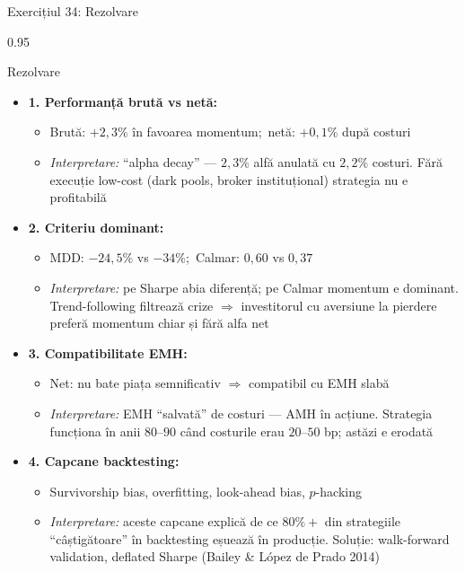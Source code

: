 \documentclass[9pt, aspectratio=169, t]{beamer}
\begin{document}
\begin{frame}[shrink=30]{Exercițiul 34: Rezolvare}
\begin{cminipage}{0.95\textwidth}
\begin{exampleblock}{Rezolvare}
\begin{itemize}\setlength{\itemsep}{0pt}
    \item \textbf{1. Performanță brută vs netă:}
    \begin{itemize}\setlength{\itemsep}{0pt}
        \item Brută: $+2{,}3\%$ în favoarea momentum;\ netă: $+0{,}1\%$ după costuri
        \item \textit{Interpretare:} ``alpha decay'' --- $2{,}3\%$ alfă anulată cu $2{,}2\%$ costuri. Fără execuție low-cost (dark pools, broker instituțional) strategia nu e profitabilă
    \end{itemize}
    \item \textbf{2. Criteriu dominant:}
    \begin{itemize}\setlength{\itemsep}{0pt}
        \item MDD: $-24{,}5\%$ vs $-34\%$;\ Calmar: $0{,}60$ vs $0{,}37$
        \item \textit{Interpretare:} pe Sharpe abia diferență; pe Calmar momentum e dominant. Trend-following filtrează crize $\Rightarrow$ investitorul cu aversiune la pierdere preferă momentum chiar și fără alfa net
    \end{itemize}
    \item \textbf{3. Compatibilitate EMH:}
    \begin{itemize}\setlength{\itemsep}{0pt}
        \item Net: nu bate piața semnificativ $\Rightarrow$ compatibil cu EMH slabă
        \item \textit{Interpretare:} EMH ``salvată'' de costuri --- AMH în acțiune. Strategia funcționa în anii $80$--$90$ când costurile erau $20$--$50$ bp; astăzi e erodată
    \end{itemize}
    \item \textbf{4. Capcane backtesting:}
    \begin{itemize}\setlength{\itemsep}{0pt}
        \item Survivorship bias, overfitting, look-ahead bias, $p$-hacking
        \item \textit{Interpretare:} aceste capcane explică de ce $80\%+$ din strategiile ``câștigătoare'' în backtesting eșuează în producție. Soluție: walk-forward validation, deflated Sharpe (Bailey \& López de Prado 2014)

\end{itemize}
\end{itemize}
\end{exampleblock}
\end{cminipage}
\end{frame}
\end{document}
